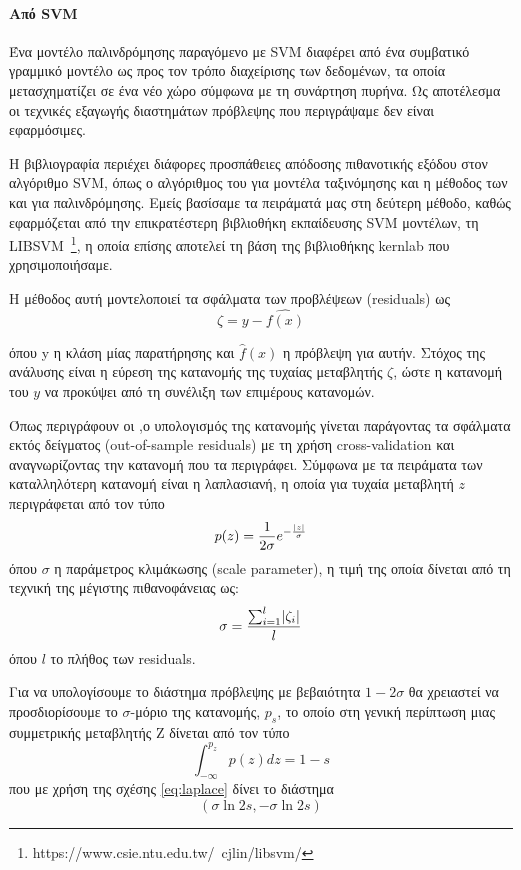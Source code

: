 \paragraph{Από SVM} Ένα μοντέλο παλινδρόμησης παραγόμενο με SVM διαφέρει από ένα συμβατικό γραμμικό μοντέλο ως προς τον τρόπο διαχείρισης των δεδομένων, τα οποία μετασχηματίζει σε ένα νέο χώρο σύμφωνα με τη συνάρτηση πυρήνα. Ως αποτέλεσμα οι τεχνικές εξαγωγής διαστημάτων πρόβλεψης που περιγράψαμε δεν είναι εφαρμόσιμες.

Η βιβλιογραφία περιέχει διάφορες προσπάθειες απόδοσης πιθανοτικής εξόδου στον αλγόριθμο SVM, όπως ο αλγόριθμος του \citet{Platt99probabilisticoutputs} για μοντέλα ταξινόμησης και η μέθοδος των \citet{Jiang:2008:ECI:1390681.1390698} και \citet{Lin04simpleprobabilistic} για παλινδρόμησης. Εμείς βασίσαμε τα πειράματά μας στη δεύτερη μέθοδο, καθώς εφαρμόζεται από την επικρατέστερη βιβλιοθήκη εκπαίδευσης SVM μοντέλων, τη LIBSVM~\footnote{https://www.csie.ntu.edu.tw/~cjlin/libsvm/}, η οποία επίσης αποτελεί τη βάση της βιβλιοθήκης kernlab που χρησιμοποιήσαμε.

Η μέθοδος αυτή μοντελοποιεί τα σφάλματα των προβλέψεων (residuals) ως
\begin{equation}
\zeta = y - \hat{f(x)}
\end{equation}

όπου y η κλάση μίας παρατήρησης και $\hat{f}(x)$ η πρόβλεψη για αυτήν. Στόχος της ανάλυσης είναι η εύρεση της κατανομής της τυχαίας μεταβλητής $\zeta$, ώστε η κατανομή του $y$ να προκύψει από τη συνέλιξη των επιμέρους κατανομών. 

Όπως περιγράφουν οι \citet{Chang:2011:LLS:1961189.1961199} ,ο υπολογισμός της κατανομής γίνεται παράγοντας τα σφάλματα εκτός δείγματος (out-of-sample residuals) με τη χρήση cross-validation και αναγνωρίζοντας την κατανομή που τα περιγράφει. Σύμφωνα με τα πειράματα των \citet{Lin04simpleprobabilistic} καταλληλότερη κατανομή είναι η λαπλασιανή, η οποία για τυχαία μεταβλητή $z$ περιγράφεται από τον τύπο
\begin{equation}
	p(z) = \frac{1}{2\sigma} e^{-\frac{\lvert z\rvert}{\sigma}}
	\label{eq:laplace}
\end{equation} 
όπου $\sigma$ η παράμετρος κλιμάκωσης (scale parameter), η τιμή της οποία δίνεται από τη τεχνική της μέγιστης πιθανοφάνειας ως:
\begin{equation}
\sigma = \frac{\sum_{i=1}^{l} \lvert\zeta_{i}\rvert}{l}
\end{equation}
όπου $l$ το πλήθος των residuals.

Για να υπολογίσουμε το διάστημα πρόβλεψης με βεβαιότητα $1-2\sigma$ θα χρειαστεί να προσδιορίσουμε το $\sigma$-μόριο της κατανομής, $p_s$, το οποίο στη γενική περίπτωση μιας συμμετρικής μεταβλητής Z δίνεται από τον τύπο
\begin{equation}
\int_{-\infty}^{p_z}p(z)dz = 1-s
\end{equation}
που με χρήση της σχέσης \ref{eq:laplace} δίνει το διάστημα
\begin{equation}
	(\sigma \ln{2 s}, -\sigma \ln{2 s})
\end{equation}


